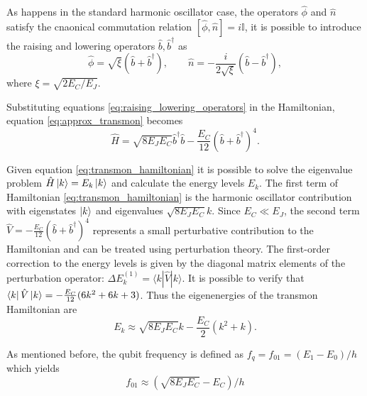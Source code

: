 As happens in the standard harmonic oscillator case, the operators $\hat{\phi}$ and $\hat{n}$ satisfy the cnaonical commutation relation $[\hat{\phi},\hat{n}]=i\mathbb{I}$, it is possible to introduce the raising and lowering operators $\hat{b},\hat{b}^\dagger$ as
\begin{equation}\label{eq:raising_lowering_operators}
    \hat{\phi} = \sqrt{\xi}(\hat{b}+\hat{b}^\dagger), \quad\quad \hat{n} = -\frac{i}{2\sqrt{\xi}}(\hat{b}-\hat{b}^\dagger),
\end{equation}
where $\xi =  \sqrt{2E_C/E_J}$.

Substituting equations \ref{eq:raising_lowering_operators} in the Hamiltonian, equation \ref{eq:approx_transmon} becomes
\begin{equation}\label{eq:transmon_hamiltonian}
    \hat{H} = \sqrt{8E_JE_C}\hat{b}^\dagger\hat{b} - \frac{E_C}{12}(\hat{b}+\hat{b}^\dagger)^4.
\end{equation}

Given equation \ref{eq:transmon_hamiltonian} it is possible to solve the eigenvalue problem $\hat{H}\ket{k}=E_k\ket{k}$ and calculate the energy levels $E_k$.
The first term of Hamiltonian \ref{eq:transmon_hamiltonian} is the harmonic oscillator contribution with eigenstates $\ket{k}$ and eigenvalues $\sqrt{8E_JE_C}k$. 
Since $E_C \ll E_J$, the second term $ \hat{V} = -\frac{E_C}{12}(\hat{b} + \hat{b}^\dagger)^4$ represents a small perturbative contribution to the Hamiltonian and can be treated using perturbation theory. 
The first-order correction to the energy levels is given by the diagonal matrix elements of the perturbation operator: $\Delta E_k^{(1)} = \langle k | \hat{V} | k \rangle$.
It is possible to verify that $\bra{k} \hat{V} \ket{k} = -\frac{E_C}{12} (6k^2 + 6k + 3)$. 
Thus the eigenenergies of the transmon Hamiltonian are 
\begin{equation}
    E_k \approx \sqrt{8E_JE_C}k - \frac{E_C}{2}(k^2 + k).
\end{equation}

As mentioned before, the qubit frequency is defined as $f_q = f_{01} = (E_1 - E_0)/h$ which yields
\begin{equation}
    f_01 \approx (\sqrt{8E_JE_C} - E_C)/h
\end{equation}

